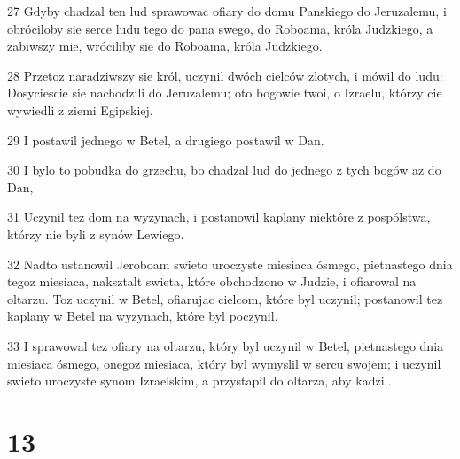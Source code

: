 \par 27 Gdyby chadzal ten lud sprawowac ofiary do domu Panskiego do Jeruzalemu, i obróciloby sie serce ludu tego do pana swego, do Roboama, króla Judzkiego, a zabiwszy mie, wróciliby sie do Roboama, króla Judzkiego.
\par 28 Przetoz naradziwszy sie król, uczynil dwóch cielców zlotych, i mówil do ludu: Dosyciescie sie nachodzili do Jeruzalemu; oto bogowie twoi, o Izraelu, którzy cie wywiedli z ziemi Egipskiej.
\par 29 I postawil jednego w Betel, a drugiego postawil w Dan.
\par 30 I bylo to pobudka do grzechu, bo chadzal lud do jednego z tych bogów az do Dan,
\par 31 Uczynil tez dom na wyzynach, i postanowil kaplany niektóre z pospólstwa, którzy nie byli z synów Lewiego.
\par 32 Nadto ustanowil Jeroboam swieto uroczyste miesiaca ósmego, pietnastego dnia tegoz miesiaca, naksztalt swieta, które obchodzono w Judzie, i ofiarowal na oltarzu. Toz uczynil w Betel, ofiarujac cielcom, które byl uczynil; postanowil tez kaplany w Betel na wyzynach, które byl poczynil.
\par 33 I sprawowal tez ofiary na oltarzu, który byl uczynil w Betel, pietnastego dnia miesiaca ósmego, onegoz miesiaca, który byl wymyslil w sercu swojem; i uczynil swieto uroczyste synom Izraelskim, a przystapil do oltarza, aby kadzil.

\chapter{13}

